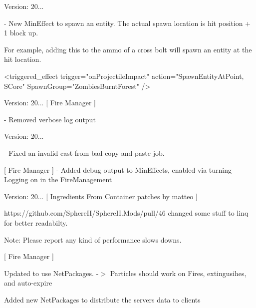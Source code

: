 Version\+: 20... \begin{DoxyVerb}[ Entity ]
    - New MinEffect to spawn an entity. The actual spawn location is hit position + 1 block up.

        For example, adding this to the ammo of a cross bolt will spawn an entity at the hit location.

        <triggered_effect trigger="onProjectileImpact" action="SpawnEntityAtPoint, SCore" SpawnGroup="ZombiesBurntForest"  />
\end{DoxyVerb}


Version\+: 20... \mbox{[} Fire Manager \mbox{]} \begin{DoxyVerb}- Removed verbose log output
\end{DoxyVerb}
 Version\+: 20... \begin{DoxyVerb}
    - Fixed an invalid cast from bad copy and paste job.

[ Fire Manager ]
    - Added debug output to MinEffects, enabled via turning Logging on in the FireManagement
\end{DoxyVerb}


Version\+: 20... \mbox{[} Ingredients From Container patches by matteo \mbox{]} \begin{DoxyVerb}https://github.com/SphereII/SphereII.Mods/pull/46
    changed some stuff to linq for better readabilty.

Note: Please report any kind of performance slows downs.    
\end{DoxyVerb}
 \mbox{[} Fire Manager \mbox{]}
\begin{DoxyItemize}
\item Updated to use Net\+Packages. -\/\texorpdfstring{$>$}{>} Particles should work on Fires, extingusihes, and auto-\/expire
\item Added new Net\+Packages to distribute the server\textquotesingle{}s data to client\textquotesingle{}s
\end{DoxyItemize}

